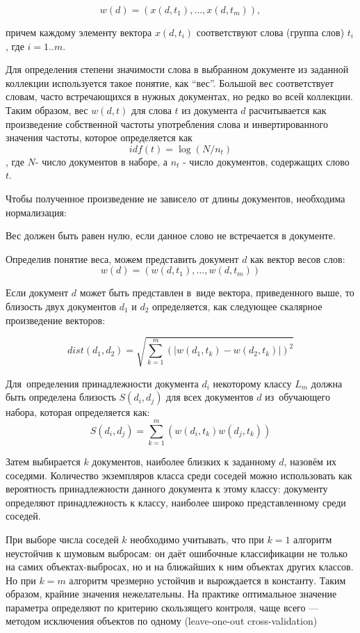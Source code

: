 $$w(d) = (x(d,t_1),\dots, x(d,t_m)),$$ 

причем каждому элементу вектора $x(d, t_i)$ соответствуют слова (группа слов) $t_i$, где $i = 1..m $.

Для определения степени значимости слова в выбранном документе из заданной коллекции
используется такое понятие, как ``вес''. 
Большой вес соответствует словам, часто встречающихся 
в нужных документах, но редко во всей коллекции. 
Таким образом, вес $w(d,t)$ для слова $t$
из документа $d$ расчитывается как произведение собственной частоты употребления слова
и инвертированного значения частоты, которое определяется как $$idf(t) = \log (N/n_t)$$,
где $N$- число документов в наборе, а $n_t$ - число документов, содержащих слово $t$.

Чтобы полученное произведение не зависело от длины документов, необходима нормализация:
  

Вес должен быть равен нулю, если данное слово не встречается в документе.

Определив понятие веса, можем представить документ $d$ как вектор весов слов:
$$w(d) = (w(d,t_1), \dots, w(d,t_m))$$

Если документ $d$ может быть представлен в~виде вектора, приведенного выше, 
то близость двух документов $d_1$ и $d_2$ определяется, как следующее скалярное произведение векторов:

$$dist(d_1,d_2) = \sqrt{\sum \limits_{k=1}^{m}(|w(d_1,t_k)-w(d_2,t_k)|)^2}$$

Для~определения принадлежности документа $d_i$ некоторому классу $L_m$ 
должна быть определена близость $S(d_i,d_j)$ для  всех документов $d$ из~обучающего набора, 
которая определяется как:  
$$S(d_i,d_j)=\sum \limits_{k=1}^{m}(w(d_i,t_k)w(d_j,t_k))$$

Затем выбирается $k$ документов, наиболее близких  к заданному $d$, назовём их соседями. 
Количество экземпляров класса среди соседей можно использовать как вероятность принадлежности данного документа к этому классу: 
документу определяют принадлежность к классу, наиболее широко представленному среди соседей. 

При выборе числа соседей $k$ необходимо учитывать, что при $k = 1$ алгоритм неустойчив к шумовым
выбросам: он даёт ошибочные классификации не только на самих объектах-выбросах, но и на 
ближайших к ним объектах других классов. 
Но при $k = m$ алгоритм чрезмерно устойчив и вырождается 
в константу. Таким образом, крайние значения  нежелательны. На практике оптимальное значение
параметра  определяют по критерию скользящего контроля, чаще всего — методом исключения объектов
по одному (leave-one-out cross-validation) \cite{machinelearning} 


